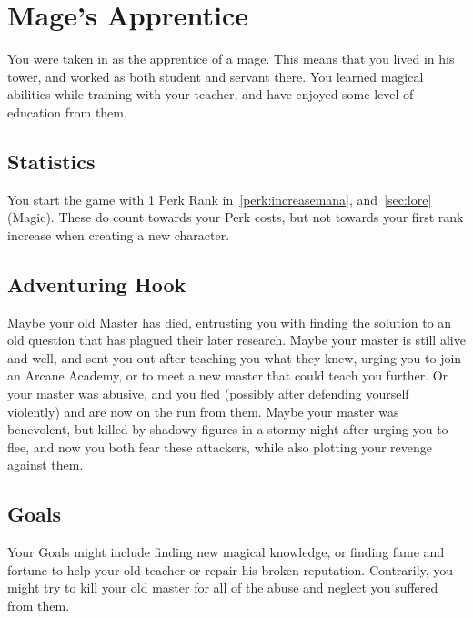 \section{Mage's Apprentice}\label{background:mageApprentice}
You were taken in as the apprentice of a mage.
This means that you lived in his tower, and worked as both student and servant there.
You learned magical abilities while training with your teacher, and have enjoyed some level of education from them.

\subsection{Statistics}
You start the game with 1 Perk Rank in~\ref{perk:increasemana}, and~\ref{sec:lore}(Magic).
These do count towards your Perk costs, but not towards your first rank increase when creating a new character.

\subsection{Adventuring Hook}
Maybe your old Master has died, entrusting you with finding the solution to an old question that has plagued their later research.
Maybe your master is still alive and well, and sent you out after teaching you what they knew, urging you to join an Arcane Academy, or to meet a new master that could teach you further.
Or your master was abusive, and you fled (possibly after defending yourself violently) and are now on the run from them.
Maybe your master was benevolent, but killed by shadowy figures in a stormy night after urging you to flee, and now you both fear these attackers, while also plotting your revenge against them.

\subsection{Goals}
Your Goals might include finding new magical knowledge, or finding fame and fortune to help your old teacher or repair his broken reputation.
Contrarily, you might try to kill your old master for all of the abuse and neglect you suffered from them.